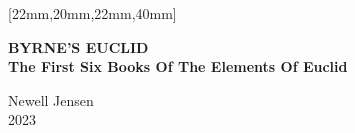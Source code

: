 \documentclass[
    12pt,
    coverheight=10in,
    coverwidth=7in,
    spinewidth=0.718in,
    marklength=0mm,
    bleedwidth=0.125in,
    ]{bookcover}
\begin{document}
\thispagestyle{empty}
\begin{bookcover}
    \thispagestyle{empty}



    [22mm,20mm,22mm,40mm]{
        \centering
        {\Huge\bfseries BYRNE'S EUCLID}\\
        \vspace{4ex}
        {\Large\bfseries The First Six Books Of The Elements Of Euclid}\\

        \vfill

        

        \vfill

        \LARGE{Newell Jensen}\\
        \LARGE{2023}
    }


\end{bookcover}
\end{document}
